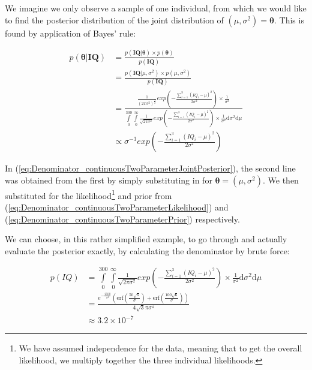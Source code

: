 \documentclass[11pt,fullpage]{book}
\begin{document}
We imagine we only observe a sample of one individual, from which we would like to find the posterior distribution of the joint distribution of $(\mu,\sigma^2)=\boldsymbol{\theta}$. This is found by application of Bayes' rule:


\begin{align}\label{eq:Denominator_continuousTwoParameterJointPosterior}
p(\boldsymbol{\theta}|\boldsymbol{IQ}) &= \frac{p(\boldsymbol{IQ}|\boldsymbol{\theta})\times p(\boldsymbol{\theta})}{p(\boldsymbol{IQ})}\\
&= \frac{p(\boldsymbol{IQ}|\mu,\sigma^2)\times p(\mu,\sigma^2)}{p(\boldsymbol{IQ})}\\
&= \frac{\frac{1}{(2\pi\sigma^2)^\frac{3}{2}} exp\left(-\frac{\sum\limits_{i=1}^{3}(IQ_i-\mu)^2}{2\sigma^2}\right)\times\frac{1}{\sigma^2}}{\int\limits_{0}^{300}\int\limits_{0}^{\infty}\frac{1}{\sqrt{2\pi\sigma^2}} exp\left(-\frac{\sum\limits_{i=1}^{3}(IQ_i-\mu)^2}{2\sigma^2}\right)\times\frac{1}{\sigma^2}\mathrm{d}\sigma^2\mathrm{d}\mu}\\
&\propto \sigma^{-3} exp\left(-\frac{\sum\limits_{i=1}^{3}(IQ_i-\mu)^2}{2\sigma^2}\right)
\end{align}

In (\ref{eq:Denominator_continuousTwoParameterJointPosterior}), the second line was obtained from the first by simply substituting in for $\boldsymbol{\theta}=(\mu,\sigma^2)$. We then substituted for the likelihood\footnote{We have assumed independence for the data, meaning that to get the overall likelihood, we multiply together the three individual likelihoods.} and prior from (\ref{eq:Denominator_continuousTwoParameterLikelihood}) and (\ref{eq:Denominator_continuousTwoParameterPrior}) respectively. 

We can choose, in this rather simplified example, to go through and actually evaluate the posterior exactly, by calculating the denominator by brute force:

\begin{align}
p(IQ)&=\int\limits_{0}^{300}\int\limits_{0}^{\infty}\frac{1}{\sqrt{2\pi\sigma^2}} exp\left(-\frac{\sum\limits_{i=1}^{3}(IQ_i-\mu)^2}{2\sigma^2}\right)\times\frac{1}{\sigma^2}\mathrm{d}\sigma^2\mathrm{d}\mu\\
&= \frac{e^{-\frac{2500}{\sigma ^2}} \left(\text{erf}\left(\frac{50 \sqrt{6}}{\sigma }\right)+\text{erf}\left(\frac{100 \sqrt{6}}{\sigma }\right)\right)}{4
   \sqrt{3} \pi  \sigma ^4}\\
&\approx 3.2\times 10^{-7}
\end{align}
\end{document}

